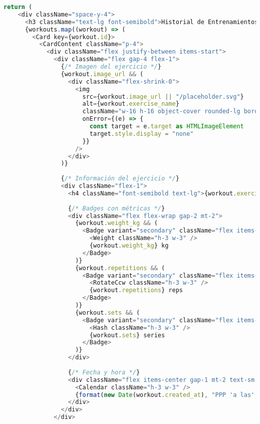 \documentclass[12pt,a4paper]{article}
\begin{document}
\begin{lstlisting}[language=typescript, caption=components/gym/workout-list.tsx - Estructura principal]
  return (
    <div className="space-y-4">
      <h3 className="text-lg font-semibold">Historial de Entrenamientos</h3>
      {workouts.map((workout) => (
        <Card key={workout.id}>
          <CardContent className="p-4">
            <div className="flex justify-between items-start">
              <div className="flex gap-4 flex-1">
                {/* Imagen del ejercicio */}
                {workout.image_url && (
                  <div className="flex-shrink-0">
                    <img
                      src={workout.image_url || "/placeholder.svg"}
                      alt={workout.exercise_name}
                      className="w-16 h-16 object-cover rounded-lg border"
                      onError={(e) => {
                        const target = e.target as HTMLImageElement
                        target.style.display = "none"
                      }}
                    />
                  </div>
                )}
                
                {/* Información del ejercicio */}
                <div className="flex-1">
                  <h4 className="font-semibold text-lg">{workout.exercise_name}</h4>
                  
                  {/* Badges con métricas */}
                  <div className="flex flex-wrap gap-2 mt-2">
                    {workout.weight_kg && (
                      <Badge variant="secondary" className="flex items-center gap-1">
                        <Weight className="h-3 w-3" />
                        {workout.weight_kg} kg
                      </Badge>
                    )}
                    {workout.repetitions && (
                      <Badge variant="secondary" className="flex items-center gap-1">
                        <RotateCcw className="h-3 w-3" />
                        {workout.repetitions} reps
                      </Badge>
                    )}
                    {workout.sets && (
                      <Badge variant="secondary" className="flex items-center gap-1">
                        <Hash className="h-3 w-3" />
                        {workout.sets} series
                      </Badge>
                    )}
                  </div>
                  
                  {/* Fecha y hora */}
                  <div className="flex items-center gap-1 mt-2 text-sm text-gray-500">
                    <Calendar className="h-3 w-3" />
                    {format(new Date(workout.created_at), "PPP 'a las' HH:mm", { locale: es })}
                  </div>
                </div>
              </div>
              

\end{lstlisting}
\end{document}
